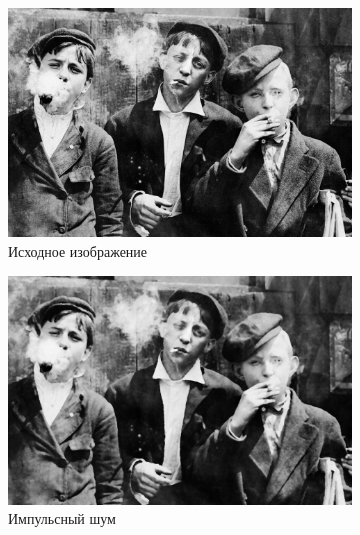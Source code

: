 \begin{figure}[ht] 
    \centering
    \begin{subfigure}[b]{0.5\linewidth}
        \centering
        \includegraphics[width=0.95\linewidth]{../lewis-hine-taschen-main-3.jpg} 
        \caption{Исходное изображение} 
        \label{rang_5_14:a} 
        \vspace{4ex}
    \end{subfigure}%
    \begin{subfigure}[b]{0.5\linewidth}
      \centering
      \includegraphics[width=0.95\linewidth]{../Rang_Filter/Rang_Impulse_noise_(k=5,r=14).jpg} 
      \caption{Импульсный шум} 
      \label{rang_5_14:b} 
      \vspace{4ex}
    \end{subfigure}
    \begin{subfigure}[b]{0.5\linewidth}
      \centering

\end{subfigure}
\end{figure}
